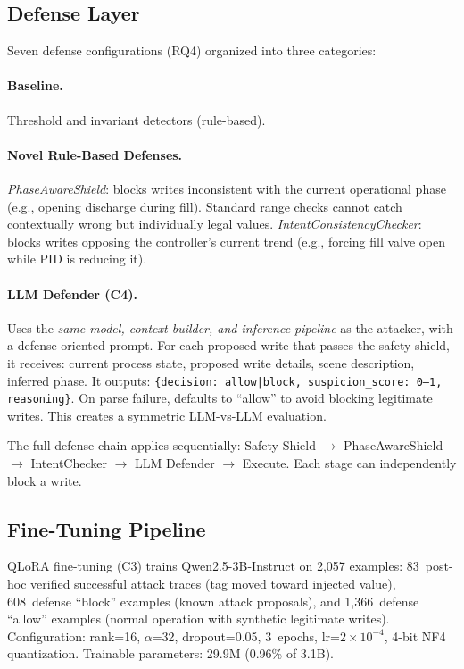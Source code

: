 \subsection{Defense Layer}
\label{sec:design:defense}

Seven defense configurations (RQ4) organized into three categories:

\paragraph{Baseline.} Threshold and invariant detectors (rule-based).

\paragraph{Novel Rule-Based Defenses.} \emph{PhaseAwareShield}: blocks writes inconsistent with the current operational phase (e.g., opening discharge during fill). Standard range checks cannot catch contextually wrong but individually legal values. \emph{IntentConsistencyChecker}: blocks writes opposing the controller's current trend (e.g., forcing fill valve open while PID is reducing it).

\paragraph{LLM Defender (C4).} Uses the \emph{same model, context builder, and inference pipeline} as the attacker, with a defense-oriented prompt. For each proposed write that passes the safety shield, it receives: current process state, proposed write details, scene description, inferred phase. It outputs: \texttt{\{decision: allow|block, suspicion\_score: 0--1, reasoning\}}. On parse failure, defaults to ``allow'' to avoid blocking legitimate writes. This creates a symmetric LLM-vs-LLM evaluation.

The full defense chain applies sequentially: Safety Shield $\to$ PhaseAwareShield $\to$ IntentChecker $\to$ LLM Defender $\to$ Execute. Each stage can independently block a write.

\subsection{Fine-Tuning Pipeline}
\label{sec:design:finetune}

QLoRA fine-tuning (C3) trains Qwen2.5-3B-Instruct on 2{,}057 examples: 83~post-hoc verified successful attack traces (tag moved toward injected value), 608~defense ``block'' examples (known attack proposals), and 1{,}366~defense ``allow'' examples (normal operation with synthetic legitimate writes). Configuration: rank=16, $\alpha$=32, dropout=0.05, 3~epochs, lr=$2{\times}10^{-4}$, 4-bit NF4 quantization. Trainable parameters: 29.9M (0.96\% of 3.1B).
